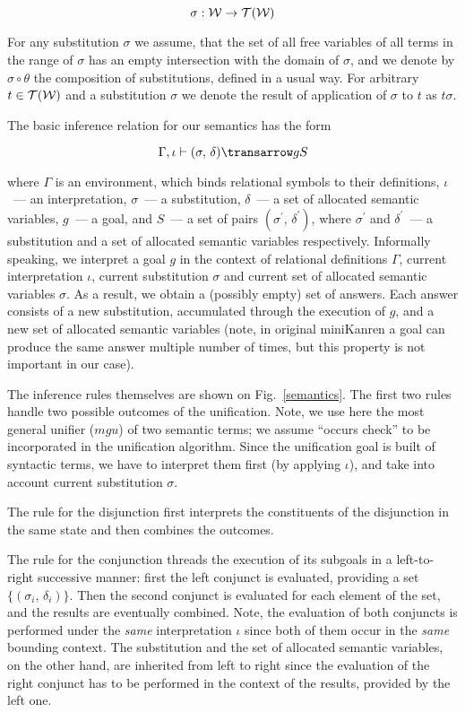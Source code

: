 $$
\sigma : {\cal{W}} \to {\cal{T}}({\cal{W}})
$$

For any substitution $\sigma$ we assume, that the set of all free variables of all terms in the range of $\sigma$ has an empty intersection with the
domain of $\sigma$, and we denote by $\sigma\circ\theta$ the composition of substitutions, defined in a usual way. For arbitrary $t\in{\cal{T}}({\cal{W}})$ and
a substitution $\sigma$ we denote the result of application of $\sigma$ to $t$ as $t\sigma$.

The basic inference relation for our semantics has the form

$$
\otrans{\Gamma,\iota}{(\sigma,\,\delta)}{g}{S}
$$

\noindent where $\Gamma$ is an environment, which binds relational symbols to their definitions, $\iota$~--- an interpretation, $\sigma$~--- a substitution, 
$\delta$~--- a set of allocated semantic variables, $g$~--- a goal, and $S$~--- a set of pairs $(\sigma^\prime,\,\delta^\prime)$, where $\sigma^\prime$ and
$\delta^\prime$~--- a substitution and a set of allocated semantic variables respectively. Informally speaking, we interpret a goal $g$ in the context of
relational definitions $\Gamma$, current interpretation $\iota$, current substitution $\sigma$ and current set of allocated semantic variables $\sigma$. As a 
result, we obtain a (possibly empty) set of answers. Each answer consists of a new substitution, accumulated through the execution of $g$, and a new set of
allocated semantic variables (note, in original miniKanren a goal can produce the same answer multiple number of times, but this property is not important
in our case).

The inference rules themselves are shown on Fig.~\ref{semantics}. The first two rules handle two possible outcomes of the unification. Note, we use here the most 
general unifier ($mgu$) of two semantic terms; we assume ``occurs check'' to be incorporated in the unification algorithm. Since the unification goal is built of 
syntactic terms, we have to interpret them first (by applying $\iota$), and take into account current substitution $\sigma$.

The rule for the disjunction first interprets the constituents of the disjunction in the same state and then combines the outcomes.

The rule for the conjunction threads the execution of its subgoals in a left-to-right successive manner: first the
left conjunct is evaluated, providing a set $\{(\sigma_i,\,\delta_i)\}$. Then the second conjunct is evaluated for each element of the set, and the
results are eventually combined. Note, the evaluation of both conjuncts is performed under the \emph{same} interpretation $\iota$ since both of them occur in the 
\emph{same} bounding context. The substitution and the set of allocated semantic variables, on the other hand, are inherited from left to right since the evaluation 
of the right conjunct has to be performed in the context of the results, provided by the left one. 

